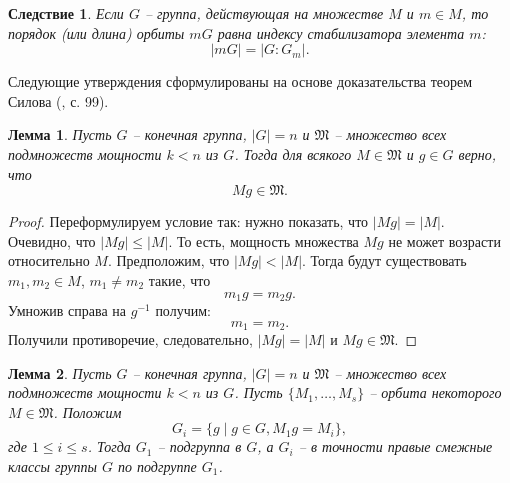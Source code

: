 \documentclass{article}
\newtheorem{corollary}{Следствие}[section]
\newtheorem{lemma}{Лемма}[section]
\begin{document}
\begin{corollary}
    Если $G$ -- группа, действующая на множестве $M$ и $m \in M$, то порядок (или длина) орбиты $mG$ равна индексу стабилизатора элемента $m$: $$ |mG| = |G:G_m|. $$
\end{corollary}

Следующие утверждения сформулированы на основе доказательства теорем Силова (\cite{kargapolov}, с. 99).

\begin{lemma} \label{txdd}
    Пусть $G$ -- конечная группа, $|G| = n$ и $ \mathfrak{M} $ -- множество всех подмножеств мощности $k < n$ из $G$. Тогда для всякого $M \in \mathfrak{M}$ и $g \in G$ верно, что $$ Mg \in \mathfrak{M}. $$
\end{lemma}
\begin{proof}
    Переформулируем условие так: нужно показать, что $|Mg| = |M|$. Очевидно, что $|Mg| \leqslant |M|$. То есть, мощность множества $Mg$ не может возрасти относительно $M$. Предположим, что $|Mg| < |M|$. Тогда будут существовать $m_1, m_2 \in M$, $m_1 \neq m_2$ такие, что $$ m_1 g = m_2 g. $$ Умножив справа на $g^{-1}$ получим: $$ m_1 = m_2. $$ Получили противоречие, следовательно, $|Mg| = |M|$ и $Mg \in \mathfrak{M}$. 
\end{proof}

\begin{lemma} \label{zpre}
    Пусть $G$ -- конечная группа, $|G| = n$ и $ \mathfrak{M} $ -- множество всех подмножеств мощности $k < n$ из $G$. Пусть $\{ M_1, \dots , M_s \}$ -- орбита некоторого $M \in \mathfrak{M}$. Положим $$ G_i = \{ g \mid g \in G, M_1 g = M_i \}, $$ где $1 \leqslant i \leqslant s $. Тогда $G_1$ -- подгруппа в $G$, а $G_i$ -- в точности правые смежные классы группы $G$ по подгруппе $G_1$.
\end{lemma}
\end{document}
